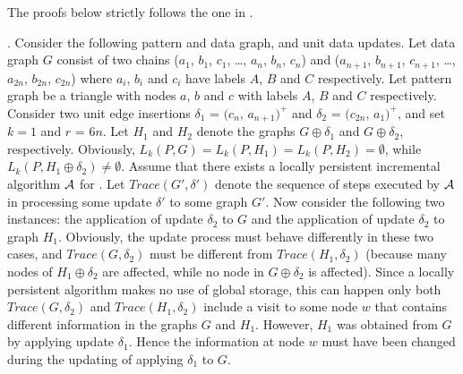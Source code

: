 \vspace{-1.5ex}
The proofs below strictly follows the one in \cite{Reps96}.


\vspace{-1.5ex}
.
Consider the following pattern and data graph, and unit data updates.
Let data graph $G$ consist of two chains ($a_1$, $b_1$, $c_1$, \ldots, $a_n$, $b_n$, $c_n$) and ($a_{n+1}$, $b_{n+1}$, $c_{n+1}$, \ldots, $a_{2n}$, $b_{2n}$, $c_{2n}$) where $a_i$, $b_i$ and $c_i$ have labels $A$, $B$ and $C$ respectively.
Let pattern graph be a triangle with nodes $a$, $b$ and $c$ with labels $A$, $B$ and $C$ respectively.
Consider two unit edge insertions $\delta_1$ = $(c_n$, $a_{n+1})^+$ and $\delta_2$ = $(c_{2n}$, $a_1)^+$,
and set $k = 1$ and $r$ = $6n$.
Let $H_1$ and $H_2$ denote the graphs $G\oplus \delta_1$ and $G\oplus \delta_2$, respectively.
Obviously, $L_{k}(P, G) = L_{k}(P, H_1) = L_{k}(P, H_2) = \emptyset$,
while $L_{k}(P, H_1\oplus \delta_2) \neq \emptyset$.
Assume that there exists a locally persistent incremental algorithm ${\cal A}$ for \dynteamF.
Let $Trace(G', \delta')$ denote the sequence of steps executed by ${\cal A}$ in processing some update $\delta'$ to some graph $G'$.
Now consider the following two instances: the application of update $\delta_2$ to $G$ and the application of update $\delta_2$ to graph $H_1$.
Obviously, the update process must behave differently in these two cases, and $Trace(G, \delta_2)$ must be different from $Trace(H_1, \delta_2)$
(because many nodes of $H_1\oplus \delta_2$ are affected, while no node in $G\oplus \delta_2$ is affected).
Since a locally persistent algorithm makes no use of global storage, this can happen only both $Trace(G, \delta_2)$ and $Trace(H_1, \delta_2)$ include a visit to some node $w$ that contains different information in the graphs $G$ and $H_1$.
However, $H_1$ was obtained from $G$ by applying update $\delta_1$.
Hence the information at node $w$ must have been changed during the updating of applying $\delta_1$ to $G$.
